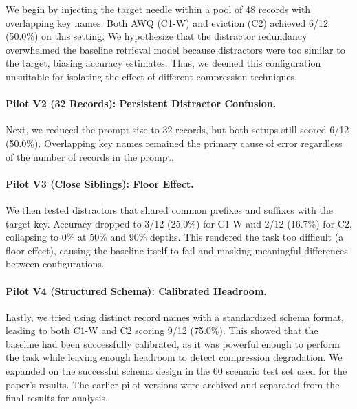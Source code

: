 \documentclass[sigconf,nonacm]{acmart}
\begin{document}
We begin by injecting the target needle within a pool of 48 records with overlapping key names. Both AWQ (C1-W) and eviction (C2) achieved 6/12 (50.0\%) on this setting. We hypothesize that the distractor redundancy overwhelmed the baseline retrieval model because distractors were too similar to the target, biasing accuracy estimates. Thus, we deemed this configuration unsuitable for isolating the effect of different compression techniques.

\paragraph{Pilot V2 (32 Records): Persistent Distractor Confusion.}
Next, we reduced the prompt size to 32 records, but both setups still scored 6/12 (50.0\%). Overlapping key names remained the primary cause of error regardless of the number of records in the prompt.

\paragraph{Pilot V3 (Close Siblings): Floor Effect.}
We then tested distractors that shared common prefixes and suffixes with the target key. Accuracy dropped to 3/12 (25.0\%) for C1-W and 2/12 (16.7\%) for C2, collapsing to 0\% at 50\% and 90\% depths. This rendered the task too difficult (a floor effect), causing the baseline itself to fail and masking meaningful differences between configurations.

\paragraph{Pilot V4 (Structured Schema): Calibrated Headroom.}
Lastly, we tried using distinct record names with a standardized schema format, leading to both C1-W and C2 scoring 9/12 (75.0\%). This showed that the baseline had been successfully calibrated, as it was powerful enough to perform the task while leaving enough headroom to detect compression degradation. We expanded on the successful schema design in the 60 scenario test set used for the paper's results. The earlier pilot versions were archived and separated from the final results for analysis.
\end{document}

